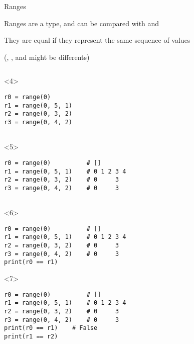 \begin{frame}[fragile]{Ranges}

   Ranges are a type, and can be compared with \TTBF{==} and \TTBF{!=}

   They are equal if they represent the same sequence of values

   (, , and  might be differents)

  \medskip

  \begin{center}

  \begin{columns}[onlytextwidth]
    \begin{column}{\textwidth}

      \begin{onlyenv}<4>
        \begin{lstlisting}[style=python,morekeywords={for, in, range, list}]
r0 = range(0)
r1 = range(0, 5, 1)
r2 = range(0, 3, 2)
r3 = range(0, 4, 2)


 \end{lstlisting}
      \end{onlyenv}

      \begin{onlyenv}<5>
        \begin{lstlisting}[style=python,morekeywords={for, in, range, list}]
r0 = range(0)          # []
r1 = range(0, 5, 1)    # 0 1 2 3 4
r2 = range(0, 3, 2)    # 0     3
r3 = range(0, 4, 2)    # 0     3


 \end{lstlisting}
      \end{onlyenv}

      \begin{onlyenv}<6>
        \begin{lstlisting}[style=python,morekeywords={for, in, range, list}]
r0 = range(0)          # []
r1 = range(0, 5, 1)    # 0 1 2 3 4
r2 = range(0, 3, 2)    # 0     3
r3 = range(0, 4, 2)    # 0     3
print(r0 == r1)

 \end{lstlisting}
      \end{onlyenv}

      \begin{onlyenv}<7>
        \begin{lstlisting}[style=python,morekeywords={for, in, range, list}]
r0 = range(0)          # []
r1 = range(0, 5, 1)    # 0 1 2 3 4
r2 = range(0, 3, 2)    # 0     3
r3 = range(0, 4, 2)    # 0     3
print(r0 == r1)    # False
print(r1 == r2)
 \end{lstlisting}
      \end{onlyenv}


\end{column}
\end{columns}
\end{center}
\end{frame}

